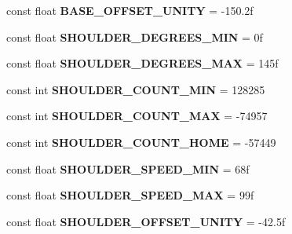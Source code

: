 \begin{DoxyCompactItemize}
\item 
\mbox{\label{class_scorbot_e_r_i_x_a48963e027682674379d3b19be69e7ca2}} 
const float {\bfseries B\+A\+S\+E\+\_\+\+O\+F\+F\+S\+E\+T\+\_\+\+U\+N\+I\+TY} = -\/150.\+2f
\item 
\mbox{\label{class_scorbot_e_r_i_x_abf5def60bf51e7f5dafb62c7ee4be5b0}} 
const float {\bfseries S\+H\+O\+U\+L\+D\+E\+R\+\_\+\+D\+E\+G\+R\+E\+E\+S\+\_\+\+M\+IN} = 0f
\item 
\mbox{\label{class_scorbot_e_r_i_x_ae2ec88d4bbc6e616043a829d44af60fc}} 
const float {\bfseries S\+H\+O\+U\+L\+D\+E\+R\+\_\+\+D\+E\+G\+R\+E\+E\+S\+\_\+\+M\+AX} = 145f
\item 
\mbox{\label{class_scorbot_e_r_i_x_afb9e614c6e3c1ad3e4a837431da57baa}} 
const int {\bfseries S\+H\+O\+U\+L\+D\+E\+R\+\_\+\+C\+O\+U\+N\+T\+\_\+\+M\+IN} = 128285
\item 
\mbox{\label{class_scorbot_e_r_i_x_a5aea6e74f6106645659af6277b7985d9}} 
const int {\bfseries S\+H\+O\+U\+L\+D\+E\+R\+\_\+\+C\+O\+U\+N\+T\+\_\+\+M\+AX} = -\/74957
\item 
\mbox{\label{class_scorbot_e_r_i_x_a37670e096b48f9a8e208f62e8251a63a}} 
const int {\bfseries S\+H\+O\+U\+L\+D\+E\+R\+\_\+\+C\+O\+U\+N\+T\+\_\+\+H\+O\+ME} = -\/57449
\item 
\mbox{\label{class_scorbot_e_r_i_x_a93c70776a83323ff29435e128a4dc9e1}} 
const float {\bfseries S\+H\+O\+U\+L\+D\+E\+R\+\_\+\+S\+P\+E\+E\+D\+\_\+\+M\+IN} = 68f
\item 
\mbox{\label{class_scorbot_e_r_i_x_ac954f63aedcf1340b4d1ecd95d8f5a0c}} 
const float {\bfseries S\+H\+O\+U\+L\+D\+E\+R\+\_\+\+S\+P\+E\+E\+D\+\_\+\+M\+AX} = 99f
\item 
\mbox{\label{class_scorbot_e_r_i_x_a66aa4b2a89db3da86451ca65d03cc85e}} 
const float {\bfseries S\+H\+O\+U\+L\+D\+E\+R\+\_\+\+O\+F\+F\+S\+E\+T\+\_\+\+U\+N\+I\+TY} = -\/42.\+5f
\item 
\mbox{\label{class_scorbot_e_r_i_x_a7e345c8cb678ece3c4b4976d2b7a4c97}} 

\end{DoxyCompactItemize}
